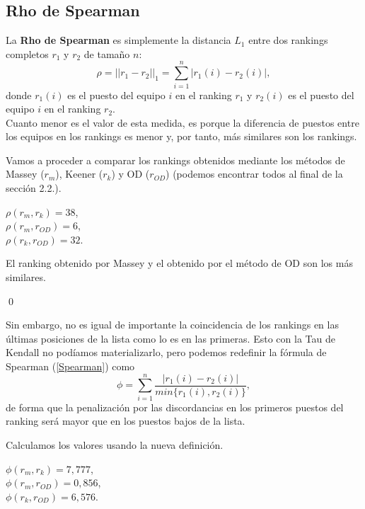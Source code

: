 \subsection{Rho de Spearman}
La \textbf{Rho de Spearman} es simplemente la distancia $L_{1}$ entre dos rankings completos $r_{1}$ y $r_{2}$ de tamaño $n$:
\begin{equation} \label{Spearman}
	\rho = ||r_{1} - r_{2}||_{1}= \sum_{i=1}^{n} |r_{1}(i) - r_{2}(i)|,
\end{equation}
donde $r_{1}(i)$ es el puesto del equipo $i$ en el ranking $r_{1}$ y $r_{2}(i)$ es el puesto del equipo $i$ en el ranking $r_{2}$. \\

Cuanto menor es el valor de esta medida, es porque la diferencia de puestos entre los equipos en los rankings es menor y, por tanto, más similares son los rankings.
\begin{ejem} Vamos a proceder a comparar los rankings obtenidos mediante los métodos de Massey ($r_{m}$), Keener ($r_{k}$) y OD ($r_{OD}$) (podemos encontrar todos al final de la sección 2.2.).
\end{ejem}
	\begin{center}
		$ \rho (r_{m},r_{k}) = 38$,\\
		$ \rho (r_{m},r_{OD}) = 6$,\\
		$ \rho (r_{k},r_{OD}) = 32.$
	\end{center}
	
	El ranking obtenido por Massey y el obtenido por el método de OD son los más similares.
	
\qed

Sin embargo, no es igual de importante la coincidencia de los rankings en las últimas posiciones de la lista como lo es en las primeras. Esto con la Tau de Kendall no podíamos materializarlo, pero podemos redefinir la fórmula de Spearman (\ref{Spearman}) como 
\begin{equation}
	\phi = \sum_{i=1}^{n} \dfrac{|r_{1}(i) - r_{2}(i)|}{min\{r_{1}(i),r_{2}(i)\}},
\end{equation}
de forma que la penalización por las discordancias en los primeros puestos del ranking será mayor que en los puestos bajos de la lista. 

\begin{ejem} Calculamos los valores usando la nueva definición.
\end{ejem}	
	\begin{center}
		$ \phi (r_{m},r_{k}) = 7,777$,\\
		$ \phi (r_{m},r_{OD}) = 0,856$,\\
		$ \phi (r_{k},r_{OD}) = 6,576$. 
	\end{center}
	
